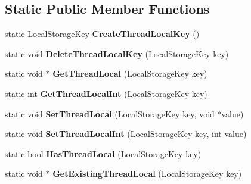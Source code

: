 \subsection*{Static Public Member Functions}
\begin{DoxyCompactItemize}
\item 
static Local\+Storage\+Key {\bfseries Create\+Thread\+Local\+Key} ()\hypertarget{classv8_1_1base_1_1_thread_abc63f50589a8aa1cfc856f625bb1cee6}{}\label{classv8_1_1base_1_1_thread_abc63f50589a8aa1cfc856f625bb1cee6}

\item 
static void {\bfseries Delete\+Thread\+Local\+Key} (Local\+Storage\+Key key)\hypertarget{classv8_1_1base_1_1_thread_a7200eefbe28a522417b36aae04021948}{}\label{classv8_1_1base_1_1_thread_a7200eefbe28a522417b36aae04021948}

\item 
static void $\ast$ {\bfseries Get\+Thread\+Local} (Local\+Storage\+Key key)\hypertarget{classv8_1_1base_1_1_thread_ac67b609a15f0a5753e1aa51e9ca612e7}{}\label{classv8_1_1base_1_1_thread_ac67b609a15f0a5753e1aa51e9ca612e7}

\item 
static int {\bfseries Get\+Thread\+Local\+Int} (Local\+Storage\+Key key)\hypertarget{classv8_1_1base_1_1_thread_a701eea751770634a5f94e76c219f5d95}{}\label{classv8_1_1base_1_1_thread_a701eea751770634a5f94e76c219f5d95}

\item 
static void {\bfseries Set\+Thread\+Local} (Local\+Storage\+Key key, void $\ast$value)\hypertarget{classv8_1_1base_1_1_thread_afead45228e4beabf84527e07159af24e}{}\label{classv8_1_1base_1_1_thread_afead45228e4beabf84527e07159af24e}

\item 
static void {\bfseries Set\+Thread\+Local\+Int} (Local\+Storage\+Key key, int value)\hypertarget{classv8_1_1base_1_1_thread_adbfc14f059c50bc461e84f4e2edacb2c}{}\label{classv8_1_1base_1_1_thread_adbfc14f059c50bc461e84f4e2edacb2c}

\item 
static bool {\bfseries Has\+Thread\+Local} (Local\+Storage\+Key key)\hypertarget{classv8_1_1base_1_1_thread_aef314b004eff7370f34cd92d8eaa1530}{}\label{classv8_1_1base_1_1_thread_aef314b004eff7370f34cd92d8eaa1530}

\item 
static void $\ast$ {\bfseries Get\+Existing\+Thread\+Local} (Local\+Storage\+Key key)\hypertarget{classv8_1_1base_1_1_thread_ace7e08cfb836780a435c23ffc0bb0a06}{}\label{classv8_1_1base_1_1_thread_ace7e08cfb836780a435c23ffc0bb0a06}

\end{DoxyCompactItemize}
